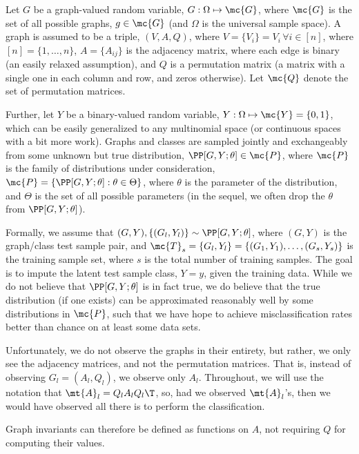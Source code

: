 
Let $G$ be a graph-valued random variable, $G: \Omega \mapsto \mc{G}$, where $\mc{G}$ is the set of all possible graphs, $g \in \mc{G}$ (and $\Omega$ is the universal sample space). A graph is assumed to be a triple, $(V,A,Q)$, where $V=\{V_i\}=V_i \, \forall i \in [n]$, where $[n]=\{1,\ldots,n\}$, $A=\{A_{ij}\}$ is the adjacency matrix, where each edge is binary (an easily relaxed assumption), and $Q$ is a permutation matrix (a matrix with a single one in each column and row, and zeros otherwise). Let $\mc{Q}$ denote the set of permutation matrices.

Further, let $Y$ be a binary-valued random variable, $Y: \Omega \mapsto \mc{Y} = \{0,1\}$, which can be easily generalized to any multinomial space (or continuous spaces with a bit more work).  Graphs and classes are sampled jointly and exchangeably from some unknown but true distribution, $\PP[G,Y; \theta] \in \mc{P}$, where $\mc{P}$ is the family of distributions under consideration, $\mc{P} = \{\PP[G,Y; \theta] : \theta \in \Theta\}$, where $\theta$ is the parameter of the distribution, and $\Theta$ is the set of all possible parameters (in the sequel, we often drop the $\theta$ from $\PP[G,Y; \theta]$).  

Formally, we assume that  $(G,Y), \{(G_l,Y_l)\} \sim \PP[G,Y; \theta]$, where $(G,Y)$ is the graph/class test sample pair, and $\mc{T}_s=\{G_l,Y_l\}=\{(G_1,Y_1),\ldots, (G_s,Y_s)\}$ is the training sample set, where $s$ is the total number of training samples.  The goal is to impute the latent test sample class, $Y=y$, given the training data.  While we do not believe that $\PP[G,Y; \theta]$ is in fact true, we do believe that the true distribution (if one exists) can be approximated reasonably well by some distributions in $\mc{P}$, such that we have hope to achieve misclassification rates better than chance on at least some data sets.  

Unfortunately, we do not observe the graphs in their entirety, but rather, we only see the adjacency matrices, and not the permutation matrices.  That is, instead of observing $G_l=(A_l,Q_l)$, we observe only $A_l$.  Throughout, we will use the notation that $\mt{A}_l = Q_l A_l Q_l\T$, so, had we observed $\mt{A}_l$'s, then we would have observed all there is to perform the classification.  

Graph invariants can therefore be defined as functions on $A$, not requiring $Q$ for computing their values.


